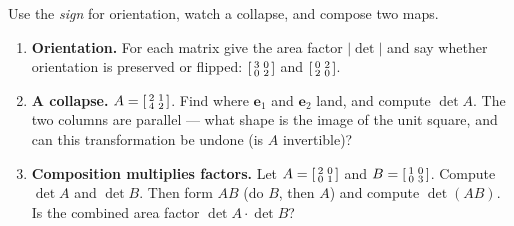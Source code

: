 \documentclass[10pt]{article}
\newcommand{\ee}{\mathbf{e}}
\begin{document}
\begin{tcolorbox}[colback=white, colframe=black!40, title=\textbf{Tier A --- Approaching Proficiency},
    fonttitle=\bfseries, arc=1.5mm, left=3mm, right=3mm, top=2mm, bottom=2mm, breakable]
Use the \emph{sign} for orientation, watch a collapse, and compose two maps.
\begin{enumerate}[leftmargin=1.7em, itemsep=9pt]
  \item \textbf{Orientation.} For each matrix give the area factor $|\det|$ and say whether orientation
        is preserved or flipped: $\begin{bsmallmatrix} 3 & 0 \\ 0 & 2 \end{bsmallmatrix}$ and
        $\begin{bsmallmatrix} 0 & 2 \\ 2 & 0 \end{bsmallmatrix}$. 
  \item \textbf{A collapse.} $A=\begin{bsmallmatrix} 2 & 1 \\ 4 & 2 \end{bsmallmatrix}$. Find where $\ee_1$
        and $\ee_2$ land, and compute $\det A$. The two columns are parallel --- what shape is the image of
        the unit square, and can this transformation be undone (is $A$ invertible)? 
  \item \textbf{Composition multiplies factors.} Let $A=\begin{bsmallmatrix} 2 & 0 \\ 0 & 1 \end{bsmallmatrix}$
        and $B=\begin{bsmallmatrix} 1 & 0 \\ 0 & 3 \end{bsmallmatrix}$. Compute $\det A$ and $\det B$. Then
        form $AB$ (do $B$, then $A$) and compute $\det(AB)$. Is the combined area factor $\det A\cdot\det B$? 
\end{enumerate}
\end{tcolorbox}
\end{document}

